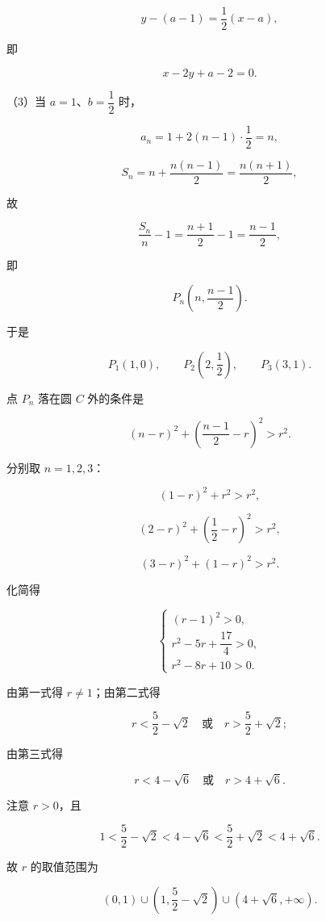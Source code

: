 \begin{answer}
\nopagebreak[4]
\[
y-(a-1)=\frac12(x-a),
\]

即

\nopagebreak[4]
\[
x-2y+a-2=0.
\]

（3）当 $a=1$、$b=\dfrac12$ 时，

\nopagebreak[4]
\[
a_n=1+2(n-1)\cdot\frac12=n,
\]

\nopagebreak[4]
\[
S_n=n+\frac{n(n-1)}{2}=\frac{n(n+1)}{2},
\]

故

\nopagebreak[4]
\[
\frac{S_n}{n}-1=\frac{n+1}{2}-1=\frac{n-1}{2},
\]

即

\nopagebreak[4]
\[
P_n\left(n,\frac{n-1}{2}\right).
\]

于是

\nopagebreak[4]
\[
P_1(1,0),\qquad P_2\left(2,\frac12\right),\qquad P_3(3,1).
\]

点 $P_n$ 落在圆 $C$ 外的条件是

\nopagebreak[4]
\[
(n-r)^2+\left(\frac{n-1}{2}-r\right)^2>r^2.
\]

分别取 $n=1,2,3$：

\nopagebreak[4]
\[
(1-r)^2+r^2>r^2,
\]

\nopagebreak[4]
\[
(2-r)^2+\left(\frac12-r\right)^2>r^2,
\]

\nopagebreak[4]
\[
(3-r)^2+(1-r)^2>r^2.
\]

化简得

\nopagebreak[4]
\[
\begin{cases}
(r-1)^2>0,\\
r^2-5r+\dfrac{17}{4}>0,\\
r^2-8r+10>0.
\end{cases}
\]

由第一式得 $r\ne1$；由第二式得

\nopagebreak[4]
\[
r<\frac52-\sqrt2\quad\text{或}\quad r>\frac52+\sqrt2;
\]

由第三式得

\nopagebreak[4]
\[
r<4-\sqrt6\quad\text{或}\quad r>4+\sqrt6.
\]

注意 $r>0$，且

\nopagebreak[4]
\[
1<\frac52-\sqrt2<4-\sqrt6<\frac52+\sqrt2<4+\sqrt6.
\]

故 $r$ 的取值范围为

\nopagebreak[4]
\[
(0,1)\cup\left(1,\frac52-\sqrt2\right)\cup(4+\sqrt6,+\infty).
\]


\end{answer}
